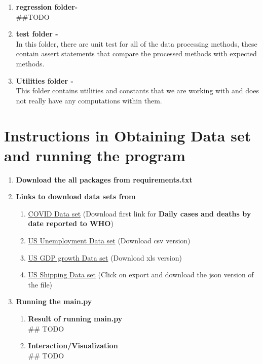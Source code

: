\documentclass[fontsize=11pt]{article}
\begin{document}
\begin{enumerate}
    \item \textbf{regression folder-}\\
    ##TODO

    \item \textbf{test folder -}\\
    In this folder, there are unit test for all of the data processing methods, these contain assert statements that compare the processed methods with expected methods.
    
    \item \textbf{Utilities folder -}\\
    This folder contains utilities and constants that we are working with and does not really have any computations within them.
    
\end{enumerate}

\section*{Instructions in Obtaining Data set and running the program}

\begin{enumerate}
    \item \textbf{Download the all packages from requirements.txt}
    \item \textbf{Links to download data sets from}
        \begin{enumerate}
            \item \href{https://covid19.who.int/info?openIndex=2}{COVID Data set} (Download first link for \textbf{Daily cases and deaths by date reported to WHO})
            \item \href{https://fred.stlouisfed.org/series/LNS14000024}{US Unemployment Data set} (Download csv version)
            \item \href{https://www.statista.com/statistics/188185/percent-change-from-preceding-period-in-real-gdp-in-the-us/}{US GDP growth Data set} (Download xls version)
            \item \href{https://data.bts.gov/Research-and-Statistics/Port-and-Commodity-TransBorder-January-2006-to-Lat/ku5b-t97n/data}{US Shipping Data set} (Click on export and download the json version of the file)
        \end{enumerate}
    \item \textbf{Running the main.py}
        \begin{enumerate}
            \item \textbf{Result of running main.py}\\
            ## TODO
            \item \textbf{Interaction/Visualization}\\
            ## TODO
        \end{enumerate}
\end{enumerate}
\end{document}
